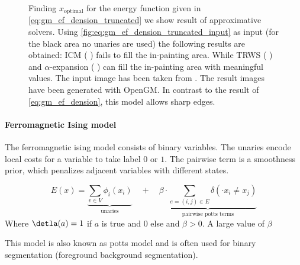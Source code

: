 \begin{figure}[H]
{    }
    \caption[Energy based truncated denoising]{
        Finding $x_{\text{optimal}} $ for the energy function given
        in \cref{eq:gm_ef_dension_truncated} we show result of approximative solvers.
        Using \cref{fig:eq:gm_ef_dension_truncated_input} as input (for the black area no unaries 
        are used)
        the following
        results are obtained: ICM \citep{besag_1986_icm}  ( ) fails
        to fill the in-painting area. While TRWS \cite{kolmogorov_2006_pami_trws}  ( ) 
        and $\alpha$-expansion \cite{boykov_2001_pami}  ( ) can fill the in-painting area
        with meaningful values.
        The input image has been taken from \citep{szeliski_2008_pami}.
        The result images have been generated with OpenGM.
        In contrast to the result of \cref{eq:gm_ef_dension}, this model
        allows sharp edges.
    }\label{fig:gm_ef_dension_truncated}
\end{figure}


\paragraph{Ferromagnetic Ising model}
The ferromagnetic ising model consists 
of binary variables.
The unaries encode local costs for a variable
to take label $0$ or $1$.
The pairwise term is a smoothness prior, which penalizes
adjacent variables with different states.

\begin{equation} \label{eq:gm_ising}
    E(x) = 
    \underbrace{
        \sum_{v \in V} \phi_i(x_i)
    }_{\text{unaries}}
     \quad +  \quad
    \underbrace{
        \beta \cdot \sum_{e=(i,j) \in E }  \delta(\cdot x_i\neq x_j) 
    }_{\text{pairwise potts terms}}
\end{equation}
Where $\detla(a)=1$ if $a$ is true and $0$ else
and $\beta>0$.
A large value of $\beta$

This model is also known as potts model and is often
used for binary segmentation (\eg foreground background segmentation).


